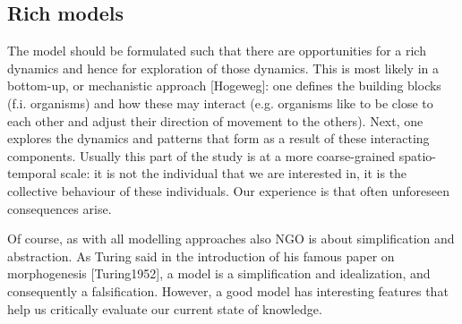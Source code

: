 \subsection{Rich models}

The model should be formulated such that there are opportunities for a rich dynamics and hence for exploration of those dynamics. This is most likely in a bottom-up, or mechanistic approach [Hogeweg]: one defines the building blocks (f.i. organisms) and how these may interact (e.g. organisms like to be close to each other and adjust their direction of movement to the others). Next, one explores the dynamics and patterns that form as a result of these interacting components. Usually this part of the study is at a more coarse-grained spatio-temporal scale: it is not the individual that we are interested in, it is the collective behaviour of these individuals. Our experience is that often unforeseen consequences arise.

Of course, as with all modelling approaches also NGO is about simplification and abstraction. As Turing said in the introduction of his famous paper on morphogenesis [Turing1952], a model is a simplification and idealization, and consequently a falsification. However, a good model has interesting features that help us critically evaluate our current state of knowledge.